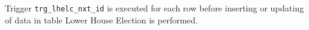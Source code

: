 Trigger \texttt{trg\_lhelc\_nxt\_id} is executed for each row before inserting or updating of data in table Lower House Election is performed.  
% 
% 
% 
% 
